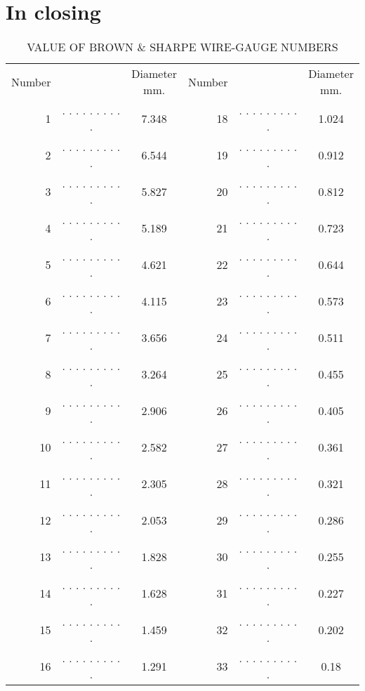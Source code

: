 \documentclass[11pt]{article}
\begin{document}


\section*{In closing}

\begin{center}

\begin{table}[h!]
 
    \caption{\textsc{VALUE OF BROWN \& SHARPE WIRE-GAUGE NUMBERS}}
    \bgroup
    \def\arraystretch{1}%
        \begin{tabular}{rcc|rcc}
            \small{Number} & & \makecell{ \small{Diameter} \\ \small{mm.} } & \small{Number} & & \makecell{ \small{Diameter} \\ \small{mm.} } \\
            1 &  . . . . . . . . . . & 7.348 & 18 &  . . . . . . . . . . & 1.024 \\
            2 &  . . . . . . . . . . & 6.544 & 19 &  . . . . . . . . . . & 0.912 \\
            3 &  . . . . . . . . . . & 5.827 & 20 &  . . . . . . . . . . & 0.812 \\
            4 &  . . . . . . . . . . & 5.189 & 21 &  . . . . . . . . . . & 0.723 \\
            5 &  . . . . . . . . . . & 4.621 & 22 &  . . . . . . . . . . & 0.644 \\
            6 &  . . . . . . . . . . & 4.115 & 23 &  . . . . . . . . . . & 0.573 \\
            7 &  . . . . . . . . . . & 3.656 & 24 &  . . . . . . . . . . & 0.511 \\
            8 &  . . . . . . . . . . & 3.264 & 25 &  . . . . . . . . . . & 0.455 \\
            9 &  . . . . . . . . . . & 2.906 & 26 &  . . . . . . . . . . & 0.405 \\
            10 &  . . . . . . . . . . & 2.582 & 27 &  . . . . . . . . . . & 0.361 \\
            11 &  . . . . . . . . . . & 2.305 & 28 &  . . . . . . . . . . & 0.321 \\
            12 &  . . . . . . . . . . & 2.053 & 29 &  . . . . . . . . . . & 0.286 \\
            13 &  . . . . . . . . . . & 1.828 & 30 &  . . . . . . . . . . & 0.255 \\
            14 &  . . . . . . . . . . & 1.628 & 31 &  . . . . . . . . . . & 0.227 \\
            15 &  . . . . . . . . . . & 1.459 & 32 &  . . . . . . . . . . & 0.202 \\
            16 &  . . . . . . . . . . & 1.291 & 33 &  . . . . . . . . . . & 0.18 \\
        \end{tabular}
    \egroup

\end{table}
 
\end{center}
\end{document}

